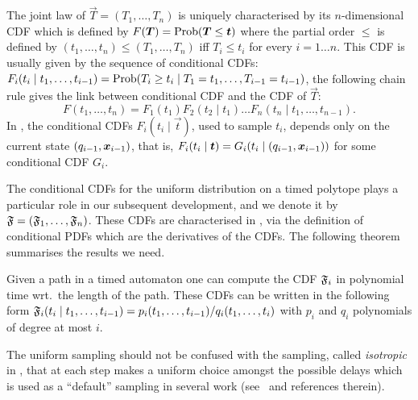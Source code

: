 The joint law of $\vec T=(T_1,\ldots,T_n)$ is uniquely characterised by its $n$-dimensional CDF which is defined by 
$F(\vec T)=\prob(\vec T\leq \vec t)$ where the partial order $\leq$ is defined by  
$(t_1,\ldots,t_n)\leq (T_1,\ldots,T_n)$ iff $T_i\leq t_i$ for every $i=1 \ldots n$. 
This CDF is usually given by the sequence of conditional CDFs: 
$F_i(t_i\mid t_1,\ldots,t_{i-1})=\textrm{Prob}(T_i\geq t_i\mid T_1= t_1,\ldots, T_{i-1}= t_{i-1})$, 
the following chain rule gives the link between conditional CDF and the CDF of $\vec T$:
$$F(t_1,\ldots,t_n)=F_1(t_1)F_2(t_2\mid t_1)\ldots F_n(t_n\mid t_1,\ldots, t_{n-1}).$$ 
In \cite{BBBK16}, the conditional CDFs $F_i(t_i\mid \vec t)$, used to sample $t_i$, depends only on the current state $(q_{i-1},\x_{i-1})$, that is, $F_i(t_i\mid \vec t)=G_i(t_i \mid (q_{i-1},\x_{i-1}))$ for some conditional CDF $G_i$. 

The conditional CDFs for the uniform distribution on a timed polytope plays a particular role in our subsequent development, and we denote it by $\mathfrak{F}=(\mathfrak{F}_1,\ldots, \mathfrak{F}_n)$. These CDFs are characterised in \cite{BBBK16}, via the definition of conditional PDFs which are the derivatives of the CDFs. The following theorem summarises the results we need.

\begin{theorem}\label{theo:unifCDF}
Given a path in a timed automaton one can compute the CDF $\mathfrak{F}_i$ in polynomial time wrt.~the length of the path. 
These CDFs can be written in the following form $ \mathfrak{F}_i(t_i\mid t_1,\ldots,t_{i-1})=p_i(t_1, \ldots,t_{i-1})/q_i(t_1,\ldots, t_i)$%
with $p_i$ and $q_i$ polynomials of degree at most $i$.
\end{theorem}

The uniform sampling should not be confused with the sampling, called \emph{isotropic} in \cite{BBBK16}, that at each step makes a uniform choice amongst the possible delays which is used as a ``default'' sampling in several work (see~\cite{smtcaveat} and references therein). 



